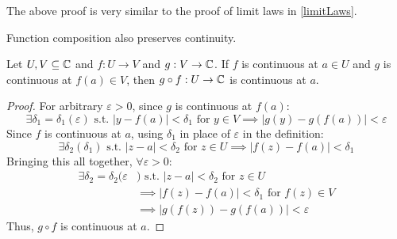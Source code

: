 \documentclass[../main.tex]{subfiles}
\begin{document}
\begin{remark}
  The above proof is very similar to the proof of limit laws in \cref{limitLaws}.
\end{remark}
Function composition also preserves continuity.
\begin{lemma}
  Let $U, V \subseteq \mathbb{C}$ and $f: U \to V$ and $g: V \to \mathbb{C}$.
  If $f$ is continuous at $a \in U$ and $g$ is continuous at $f(a) \in V$, then $g \circ f: U \to \mathbb{C}$ is continuous at $a$.
\end{lemma}
\begin{proof}
  For arbitrary $\varepsilon > 0$, since $g$ is continuous at $f(a)$:
  \[
    \exists \delta_1 = \delta_1(\varepsilon) \text{ s.t. } |y - f(a)| < \delta_1 \text{ for } y \in V \implies |g(y) - g(f(a))| < \varepsilon
  \]
  Since $f$ is continuous at $a$, using $\delta_1$ in place of $\varepsilon$ in the definition:
  \[
    \exists \delta_2(\delta_1) \text{ s.t. } |z - a| < \delta_2 \text{ for } z \in U \implies |f(z) - f(a)| < \delta_1
  \]
  Bringing this all together, $\forall \varepsilon > 0$:
  \begin{align*}
    \exists \delta_2 = \delta_2(\varepsilon&) \text{ s.t. } |z - a| < \delta_2 \text{ for } z \in U \\
    &\implies |f(z) - f(a)| < \delta_1 \text{ for $f(z) \in V$} \\
    &\implies |g(f(z)) - g(f(a))| < \varepsilon
  \end{align*}
  Thus, $g \circ f$ is continuous at $a$.
\end{proof}
\end{document}
